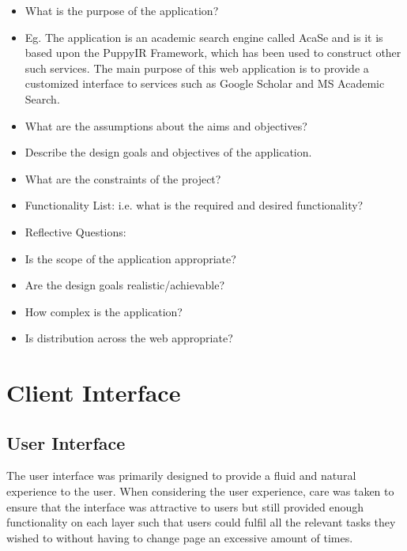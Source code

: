 \documentclass{sig-alt-release2}
\begin{document}
\begin{itemize}

\item	What is the purpose of the application?
\item	Eg. The application is an academic search engine called AcaSe and is it is based upon the PuppyIR Framework\cite{glassey2011framework}, which has been used to construct other such services\cite{glassey2010fifi,elliot2010fifi}. The main purpose of this web application is to provide a customized interface to services such as Google Scholar and MS Academic Search. 

\item	What are the assumptions about the aims and objectives?

\item	Describe the design goals and objectives of the application.

\item	What are the constraints of the project?

\item	Functionality List: i.e. what is the required and desired functionality?

\item	Reflective Questions: 
\item	Is the scope of the application appropriate? 
\item	Are the design goals realistic/achievable? 
\item	How complex is the application? 
\item	Is distribution across the web appropriate? 

\end{itemize}

\section{Client Interface}

\subsection{User Interface}

The user interface was primarily designed to provide a fluid and natural experience to the user. When considering the user experience, care was taken to ensure that the interface was attractive to users but still provided enough functionality on each layer such that users could fulfil all the relevant tasks they wished to without having to change page an excessive amount of times. \\
\end{document}
